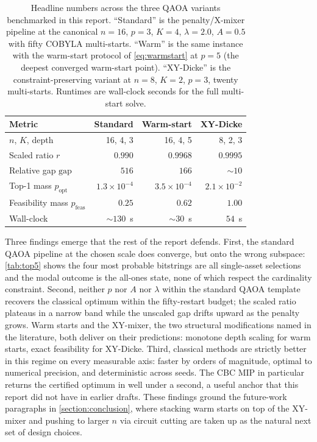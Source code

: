 \begin{table}[!b]
    \centering
    \small 
    \caption{Headline numbers across the three QAOA variants benchmarked in this report. ``Standard'' is the penalty/X-mixer pipeline at the canonical $n=16$, $p=3$, $K=4$, $\lambda=2.0$, $A=0.5$ with fifty COBYLA multi-starts. ``Warm'' is the same instance with the warm-start protocol of \cref{eq:warmstart} at $p=5$ (the deepest converged warm-start point). ``XY-Dicke'' is the constraint-preserving variant at $n=8$, $K=2$, $p=3$, twenty multi-starts. Runtimes are wall-clock seconds for the full multi-start solve.}
    \label{tab:results-summary}
    \begin{tabular}{@{}lrrr@{}}
        \toprule
        Metric & Standard & Warm-start & XY-Dicke \\
        \midrule
        $n$, $K$, depth                        & 16, 4, 3              & 16, 4, 5             & 8, 2, 3 \\
        Scaled ratio $r$                       & $0.990$               & $0.9968$             & $0.9995$ \\
        Relative gap $\mathrm{gap}$            & $516$                 & $166$                & $\sim 10$ \\
        Top-1 mass $p_{\text{opt}}$            & $1.3\times 10^{-4}$   & $3.5\times 10^{-4}$  & $2.1\times 10^{-2}$ \\
        Feasibility mass $p_{\text{feas}}$     & $0.25$                & $0.62$               & $1.00$ \\
        Wall-clock                             & $\sim 130$~s          & $\sim 30$~s          & $54$~s \\
        \bottomrule
    \end{tabular}
\end{table}

Three findings emerge that the rest of the report defends. First, the standard QAOA pipeline at the chosen scale does converge, but onto the wrong subspace: \cref{tab:top5} shows the four most probable bitstrings are all single-asset selections and the modal outcome is the all-ones state, none of which respect the cardinality constraint. Second, neither $p$ nor $A$ nor $\lambda$ within the standard QAOA template recovers the classical optimum within the fifty-restart budget; the scaled ratio plateaus in a narrow band while the unscaled gap drifts upward as the penalty grows. Warm starts and the XY-mixer, the two structural modifications named in the literature, both deliver on their predictions: monotone depth scaling for warm starts, exact feasibility for XY-Dicke. Third, classical methods are strictly better in this regime on every measurable axis: faster by orders of magnitude, optimal to numerical precision, and deterministic across seeds. The CBC MIP in particular returns the certified optimum in well under a second, a useful anchor that this report did not have in earlier drafts. These findings ground the future-work paragraphs in \cref{section:conclusion}, where stacking warm starts on top of the XY-mixer and pushing to larger $n$ via circuit cutting \parencite{soloviev2025cutting} are taken up as the natural next set of design choices.
